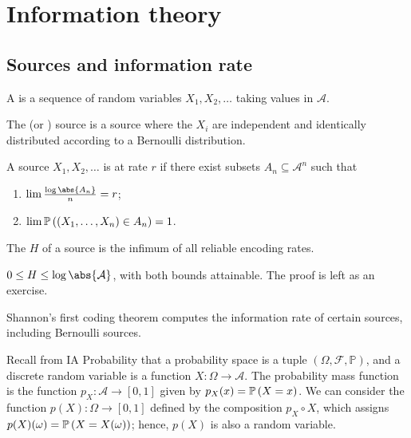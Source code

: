 \section{Information theory}

\subsection{Sources and information rate}
\begin{definition}
    A  is a sequence of random variables $X_1, X_2, \dots$ taking values in $\mathcal A$.
\end{definition}
\begin{example}
    The  (or ) source is a source where the $X_i$ are independent and identically distributed according to a Bernoulli distribution.
\end{example}
\begin{definition}
    A source $X_1, X_2, \dots$ is  at rate $r$ if there exist subsets $A_n \subseteq \mathcal A^n$ such that
    \begin{enumerate}
        \item $\lim \frac{\log \abs{A_n}}{n} = r$;
        \item $\lim \mathbb{P}\left({(X_1, \dots, X_n) \in A_n}\right) = 1$.
    \end{enumerate}
\end{definition}
\begin{definition}
    The  $H$ of a source is the infimum of all reliable encoding rates.
\end{definition}
\begin{example}
    $0 \leq H \leq \log\abs{\mathcal A}$, with both bounds attainable.
    The proof is left as an exercise.
\end{example}
Shannon's first coding theorem computes the information rate of certain sources, including Bernoulli sources.

Recall from IA Probability that a probability space is a tuple $(\Omega, \mathcal F, \mathbb P)$, and a discrete random variable is a function $X \colon \Omega \to \mathcal A$.
The probability mass function is the function $p_X \colon \mathcal A \to [0,1]$ given by $p_X(x) = \mathbb{P}\left({X = x}\right)$.
We can consider the function $p(X) \colon \Omega \to [0,1]$ defined by the composition $p_X \circ X$, which assigns $p(X)(\omega) = \mathbb{P}\left({X = X(\omega)}\right)$; hence, $p(X)$ is also a random variable.

